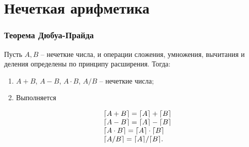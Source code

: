 \documentclass[24pt,pdf,hyperref={unicode},aspectratio=169]{beamer}
\begin{document}
\section{Нечеткая арифметика}


\begin{frame}\frametitle{Теорема Дюбуа-Прайда}

Пусть $A,B$ -- нечеткие числа, и операции сложения, умножения, вычитания и деления определены по принципу расширения. Тогда:

\begin{enumerate}[<+->]
\item $A+B$, $A-B$, $A\cdot B$, $A/B$ -- нечеткие числа;
\item Выполняется

$$
\begin{array}{l}
\lceil A+B \rceil=\lceil A \rceil+\lceil B \rceil\\
\lceil A-B \rceil=\lceil A \rceil-\lceil B \rceil\\
\lceil A\cdot B \rceil=\lceil A \rceil\cdot\lceil B \rceil\\
\lceil A/B \rceil=\lceil A \rceil/\lceil B \rceil.
\end{array}
$$
\end{enumerate}
\end{frame}
\end{document}
